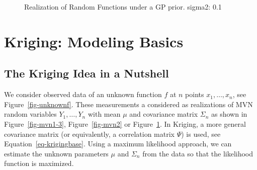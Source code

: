 \documentclass[
  letterpaper,
  DIV=11,
  numbers=noendperiod]{scrreprt}
\begin{document}
\begin{figure}[H]


\caption{\label{fig-mvn5}Realization of Random Functions under a GP
prior. sigma2: 0.1}

\end{figure}%

\section{Kriging: Modeling Basics}\label{kriging-modeling-basics}

\subsection{The Kriging Idea in a
Nutshell}\label{the-kriging-idea-in-a-nutshell}

We consider observed data of an unknown function \(f\) at \(n\) points
\(x_1, \ldots, x_n\), see Figure~\ref{fig-unknownf}. These measurements
a considered as realizations of MVN random variables
\(Y_1, \ldots, Y_n\) with mean \(\mu\) and covariance matrix
\(\Sigma_n\) as shown in Figure~\ref{fig-mvn1-3}, Figure~\ref{fig-mvn2}
or Figure~\ref{fig-mvn5}. In Kriging, a more general covariance matrix
(or equivalently, a correlation matrix \(\Psi\)) is used, see
Equation~\ref{eq-krigingbase}. Using a maximum likelihood approach, we
can estimate the unknown parameters \(\mu\) and \(\Sigma_n\) from the
data so that the likelihood function is maximized.
\end{document}
